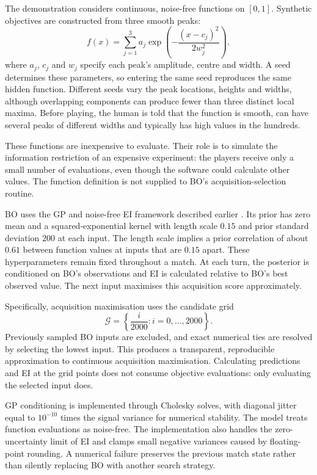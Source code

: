 The demonstration considers continuous, noise-free functions on
\([0,1]\). Synthetic objectives are constructed from three smooth peaks:
\[
    f(x)=\sum_{j=1}^{3}
    a_j\exp\left(
        -\frac{(x-c_j)^2}{2w_j^2}
    \right),
\]
where \(a_j\), \(c_j\) and \(w_j\) specify each peak's amplitude, centre
and width. A seed determines these parameters, so entering the same
seed reproduces the same hidden function. Different seeds vary the peak
locations, heights and widths, although overlapping components can
produce fewer than three distinct local maxima. Before playing, the
human is told that the function is smooth, can have several peaks of
different widths and typically has high values in the hundreds.

These functions are inexpensive to evaluate. Their role is to simulate
the information restriction of an expensive experiment: the players
receive only a small number of evaluations, even though the software
could calculate other values. The function definition is not supplied
to BO's acquisition-selection routine.

BO uses the GP and noise-free EI framework described earlier
\cite{frazier2018tutorial}. Its prior has zero mean and a
squared-exponential kernel with length scale \(0.15\) and prior
standard deviation \(200\) at each input. The length scale implies a
prior correlation of about \(0.61\) between function values at inputs
that are \(0.15\) apart. These hyperparameters remain fixed throughout
a match. At each turn, the posterior is conditioned on BO's observations and EI is
calculated relative to BO's best observed value. The next input
maximises this acquisition score approximately.

Specifically, acquisition maximisation uses the candidate grid
\[
    \mathcal{G}
    =
    \left\{
        \frac{i}{2000}:i=0,\ldots,2000
    \right\}.
\]
Previously sampled BO inputs are excluded, and exact numerical ties
are resolved by selecting the lowest input. This produces a transparent,
reproducible approximation to continuous acquisition maximisation.
Calculating predictions and EI at the grid points does not consume
objective evaluations: only evaluating the selected input does.

GP conditioning is implemented through Cholesky solves, with diagonal
jitter equal to \(10^{-10}\) times the signal variance for numerical
stability. The model treats function evaluations as noise-free.
The implementation also handles the zero-uncertainty limit of EI and
clamps small negative variances caused by floating-point rounding.
A numerical failure preserves the previous match state rather than
silently replacing BO with another search strategy.

